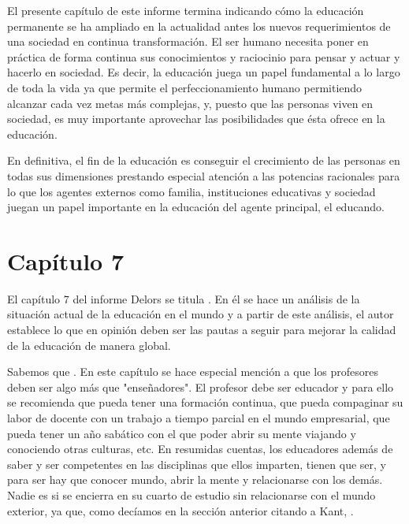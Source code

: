 El presente capítulo de este informe termina indicando cómo la educación permanente se ha ampliado en la actualidad antes los nuevos requerimientos de una sociedad en continua transformación.
%
El ser humano necesita poner en práctica de forma continua sus conocimientos y raciocinio para pensar y actuar y hacerlo en sociedad.
%
Es decir, la educación juega un papel fundamental a lo largo de toda la vida ya que permite el perfeccionamiento humano permitiendo alcanzar cada vez metas más complejas, y, puesto que las personas viven en sociedad, es muy importante aprovechar las posibilidades que ésta ofrece en la educación.
%

En definitiva, el fin de la educación es conseguir el crecimiento de las personas en todas sus dimensiones prestando especial atención a las potencias racionales para lo que los agentes externos como familia, instituciones educativas y sociedad juegan un papel importante en la educación del agente principal, el educando.



\section*{Capítulo 7}

El capítulo 7 del informe Delors se titula .
%
En él se hace un análisis de la situación actual de la educación en el mundo y a partir de este análisis, el autor establece lo que en opinión deben ser las pautas a seguir para mejorar la calidad de la educación de manera global.


Sabemos que .
%
En este capítulo se hace especial mención a que los profesores deben ser algo más que "enseñadores".
%
El profesor debe ser educador y para ello se recomienda que pueda tener una formación continua, que pueda compaginar su labor de docente con un trabajo a tiempo parcial en el mundo empresarial, que pueda tener un año sabático con el que poder abrir su mente viajando y conociendo otras culturas, etc.
%
En resumidas cuentas, los educadores además de saber y ser competentes en las disciplinas que ellos imparten, tienen que ser, y para ser hay que conocer mundo, abrir la mente y relacionarse con los demás.
%
Nadie es si se encierra en su cuarto de estudio sin relacionarse con el mundo exterior, ya que, como decíamos en la sección anterior citando a Kant, . 


